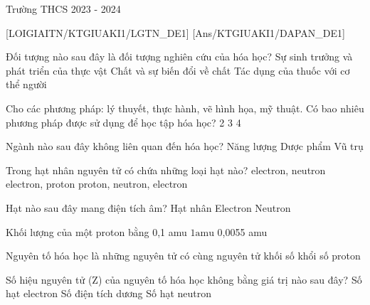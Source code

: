 \def\x{210}
\setcounter{bt}{0}
\setcounter{ex}{0}
\begin{name}[][][][]{Trường THCS }{2023 - 2024}
\end{name}
[LOIGIAITN/KTGIUAKI1/LGTN_DE1]
[Ans/KTGIUAKI1/DAPAN_DE1]
\begin{ex}
	Đối tượng nào sau đây là đối tượng nghiên cứu của hóa học?
	{Sự sinh trưởng và phát triển của thực vật}
	{Chất và sự biến đổi về chất}
	{Tác dụng của thuốc với cơ thể người}
\end{ex}
\begin{ex}
	Cho các phương pháp: lý thuyết, thực hành, vẽ hình họa, mỹ thuật. Có bao nhiêu phương pháp được sử dụng để học tập hóa học?
	{2}
	{3}
	{4}
\end{ex}
\begin{ex}
	Ngành nào sau đây không liên quan đến hóa học?
	{Năng lượng}
	{Dược phẩm}
	{Vũ trụ}
\end{ex}
\begin{ex}
	Trong hạt nhân nguyên tử có chứa những loại hạt nào?
	{electron, neutron}
	{electron, proton}
	{proton, neutron, electron}
\end{ex}
\begin{ex}
	Hạt nào sau đây mang điện tích âm?
	{Hạt nhân}
	{Electron}
	{Neutron}
\end{ex}
\begin{ex}
	Khối lượng của một proton bằng
	{0,1 amu}
	{$1 \mathrm{amu}$}
	{0,0055 amu}
\end{ex}
\begin{ex}
	Nguyên tố hóa học là những nguyên tử có cùng
	{nguyên tử khối}
	{số khổi}
	{số proton}
\end{ex}
\begin{ex}
	Số hiệu nguyên tử (Z) của nguyên tố hóa học không bằng giá trị nào sau đây?
	{Số hạt electron}
	{Số điện tích dương}
	{Số hạt neutron}
\end{ex}
